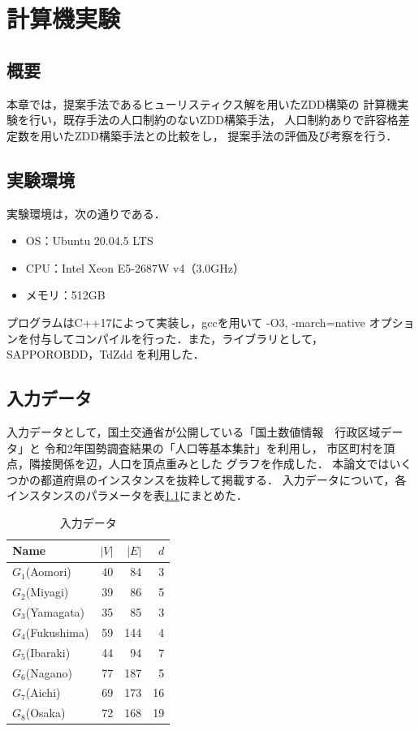\chapter{計算機実験} \label{chapter:5}

\section{概要}
本章では，提案手法であるヒューリスティクス解を用いたZDD構築の
計算機実験を行い，既存手法の人口制約のないZDD構築手法，
人口制約ありで許容格差定数を用いたZDD構築手法との比較をし，
提案手法の評価及び考察を行う．

\section{実験環境}
実験環境は，次の通りである．

\begin{itemize}
  \item OS：Ubuntu 20.04.5 LTS
  \item CPU：Intel Xeon E5-2687W v4（3.0GHz）
  \item メモリ：512GB
\end{itemize}

プログラムはC++17によって実装し，gccを用いて -O3, -march=native
オプションを付与してコンパイルを行った．また，ライブラリとして，
SAPPOROBDD，TdZdd を利用した．

\section{入力データ}
入力データとして，国土交通省が公開している「国土数値情報　行政区域データ」と
令和2年国勢調査結果の「人口等基本集計」を利用し，
市区町村を頂点，隣接関係を辺，人口を頂点重みとした
グラフを作成した．
本論文ではいくつかの都道府県のインスタンスを抜粋して掲載する．
入力データについて，各インスタンスのパラメータを表\ref{input_data}にまとめた．

\begin{table}[htbp]
  \caption{入力データ}
  \label{input_data}
  \centering
  \begin{tabular}{l|rrr}
    \hline
    Name & $|V|$ & $|E|$ & $d$ \\
    \hline \hline
    $G_1$(Aomori) & 40 & 84 & 3 \\
    $G_2$(Miyagi) & 39 & 86 & 5 \\
    $G_3$(Yamagata) & 35 & 85 & 3 \\
    $G_4$(Fukushima) & 59 & 144 & 4 \\
    $G_5$(Ibaraki) & 44 & 94 & 7 \\
    $G_6$(Nagano) & 77 & 187 & 5 \\
    $G_7$(Aichi) & 69 & 173 & 16 \\
    $G_8$(Osaka) & 72 & 168 & 19 \\
    \hline
  \end{tabular}
\end{table}


